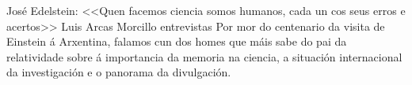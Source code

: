 %
%
%
%


%
%
%
\Titular%
{José Edelstein: <<Quen facemos ciencia somos humanos, cada un cos seus erros e acertos>>}%
{Luis Arcas Morcillo}%
{entrevistas}%
{Por mor do centenario da visita de Einstein á Arxentina, falamos cun dos homes que máis sabe do pai da relatividade sobre á importancia da memoria na ciencia, a situación internacional da investigación e o panorama da divulgación.}%


